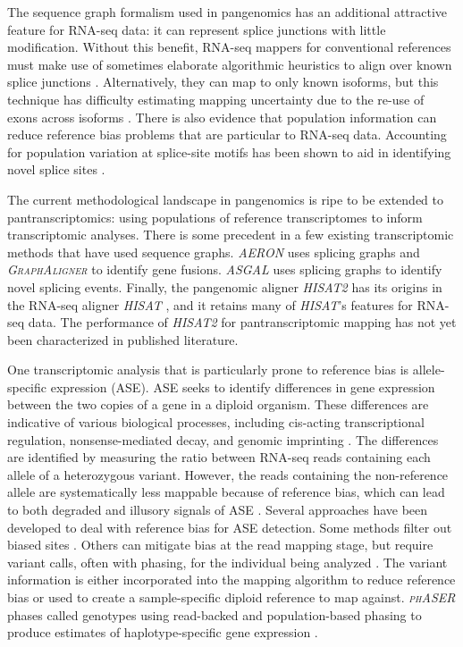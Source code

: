 \documentclass[11pt]{ucthesis}
\newcommand{\tool}[1]{\emph{\textsc{#1}}}
\begin{document}
The sequence graph formalism used in pangenomics has an additional attractive feature for RNA-seq data: it can represent splice junctions with little modification. Without this benefit, RNA-seq mappers for conventional references must make use of sometimes elaborate algorithmic heuristics to align over known splice junctions \cite{dobin2013star,wu2016gmap}. Alternatively, they can map to only known isoforms, but this technique has difficulty estimating mapping uncertainty due to the re-use of exons across isoforms \cite{langmead2012fast}. There is also evidence that population information can reduce reference bias problems that are particular to RNA-seq data. Accounting for population variation at splice-site motifs has been shown to aid in identifying novel splice sites \cite{stein2015discover}. 

The current methodological landscape in pangenomics is ripe to be extended to pantranscriptomics: using populations of reference transcriptomes to inform transcriptomic analyses. There is some precedent in a few existing transcriptomic methods that have used sequence graphs. \tool{AERON} \cite{rautiainen2020aeron} uses splicing graphs and \tool{GraphAligner} \cite{rautiainen2020graphaligner} to identify gene fusions. \tool{ASGAL} \cite{denti2018asgal} uses splicing graphs to identify novel splicing events. Finally, the pangenomic aligner \tool{HISAT2} \cite{kim2019graph} has its origins in the RNA-seq aligner \tool{HISAT} \cite{kim2015hisat}, and it retains many of \tool{HISAT}'s features for RNA-seq data. The performance of \tool{HISAT2} for pantranscriptomic mapping has not yet been characterized in published literature. 

One transcriptomic analysis that is particularly prone to reference bias is allele-specific expression (ASE). ASE seeks to identify differences in gene expression between the two copies of a gene in a diploid organism. These differences are indicative of various biological processes, including cis-acting transcriptional regulation, nonsense-mediated decay, and genomic imprinting \cite{zink2018insights,castel2015tools}. The differences are identified by measuring the ratio between RNA-seq reads containing each allele of a heterozygous variant. However, the reads containing the non-reference allele are systematically less mappable because of reference bias, which can lead to both degraded and illusory signals of ASE \cite{degner2009effect}. Several approaches have been developed to deal with reference bias for ASE detection. Some methods filter out biased sites \cite{van2015wasp}. Others can mitigate bias at the read mapping stage, but require variant calls, often with phasing, for the individual being analyzed \cite{rozowsky2011alleleseq,miao2018aselux,raghupathy2018hierarchical}. The variant information is either incorporated into the mapping algorithm to reduce reference bias or used to create a sample-specific diploid reference to map against. \tool{phASER} phases called genotypes using read-backed and population-based phasing to produce estimates of haplotype-specific gene expression \cite{castel2016rare}. 
\end{document}
